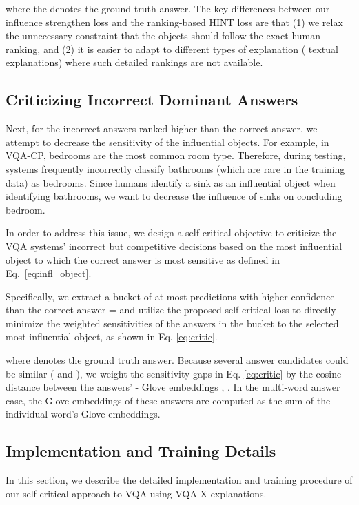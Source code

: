 \documentclass{article}
\begin{document}
where the  denotes the ground truth answer. The key differences between our influence strengthen loss and the ranking-based HINT loss are that (1) we relax the unnecessary constraint that the objects should follow the exact human ranking, and (2) it is easier to adapt to different types of explanation ( textual explanations) where such detailed rankings are not available.


\subsection{Criticizing Incorrect Dominant Answers}

Next, for the incorrect answers ranked higher than the correct answer, we attempt to decrease the sensitivity of the influential objects. For example, in VQA-CP, bedrooms are the most common room type. Therefore, during testing, systems frequently incorrectly classify bathrooms (which are rare in the training data) as bedrooms. Since humans identify a sink as an influential object when identifying bathrooms, we want to decrease the influence of sinks on concluding bedroom.

In order to address this issue, we design a self-critical objective to criticize the VQA systems' incorrect but competitive decisions based on the most influential object  to which the correct answer is most sensitive as defined in Eq.\ \ref{eq:infl_object}. 

Specifically, we extract a bucket of at most  predictions with higher confidence than the correct answer  =  and utilize the proposed self-critical loss  to directly minimize the weighted sensitivities  of the answers in the bucket   to the selected most influential object, as shown in Eq. \ref{eq:critic}.

where  denotes the ground truth answer. Because several answer candidates could be similar (  and ), we weight the sensitivity gaps in Eq. \ref{eq:critic} by the cosine distance between the answers' - Glove embeddings \cite{pennington2014glove},  . In the multi-word answer case, the Glove embeddings of these answers are computed as the sum of the individual word's Glove embeddings.

\subsection{Implementation and Training Details}
In this section, we describe the detailed implementation and training procedure of our self-critical approach to VQA using VQA-X explanations.
\end{document}

